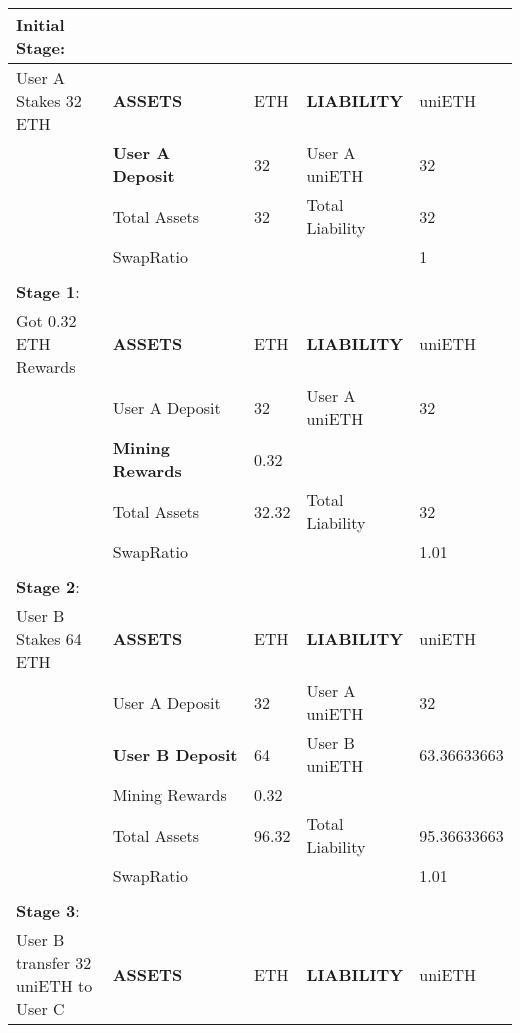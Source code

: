 \documentclass{article}
\begin{document}
\begin{table}[!ht]
    \centering
    \begin{tabular}{p{0.2\linewidth} | p{0.3\linewidth}| p{0.1\linewidth}| p{0.2\linewidth}| p{0.2\linewidth}}
    \hline
        \textbf{Initial Stage}:  & ~ & ~ & ~ & ~ \\ \hline
        User A Stakes 32 ETH & \textbf{ASSETS} & ETH & \textbf{LIABILITY} & uniETH \\ \hline
        ~ & \textbf{User A Deposit} & 32 & User A uniETH & 32 \\ \hline
        ~ & Total Assets & 32 & Total Liability & 32 \\ \hline
        ~ & SwapRatio & ~ & ~ & 1 \\ \hline
        \multicolumn{5}{c}{} \\ \hline
        \textbf{Stage 1}:  & ~ & ~ & ~ & ~ \\ \hline
        Got 0.32 ETH Rewards & \textbf{ASSETS} & ETH & \textbf{LIABILITY} & uniETH \\ \hline
        ~ & User A Deposit & 32 & User A uniETH & 32 \\ \hline
        ~ & \textbf{Mining Rewards} & 0.32 & ~ & ~ \\ \hline
        ~ & Total Assets & 32.32 & Total Liability & 32 \\ \hline
        ~ & SwapRatio & ~ & ~ & 1.01 \\ \hline
        \multicolumn{5}{c}{} \\ \hline
        \textbf{Stage 2}:  & ~ & ~ & ~ & ~ \\ \hline
        User B Stakes 64 ETH & \textbf{ASSETS} & ETH & \textbf{LIABILITY} & uniETH \\ \hline
        ~ & User A Deposit & 32 & User A uniETH & 32 \\ \hline
        ~ & \textbf{User B Deposit} & 64 & User B uniETH & 63.36633663 \\ \hline
        ~ & Mining Rewards & 0.32 & ~ & ~ \\ \hline
        ~ & Total Assets & 96.32 & Total Liability & 95.36633663 \\ \hline
        ~ & SwapRatio & ~ & ~ & 1.01 \\ \hline
        \multicolumn{5}{c}{} \\ \hline
        \textbf{Stage 3}: & ~ & ~ & ~ & ~ \\ \hline
        User B transfer 32 uniETH to User C & \textbf{ASSETS} & ETH & \textbf{LIABILITY} & uniETH \\ \hline

\end{tabular}
\end{table}
\end{document}
